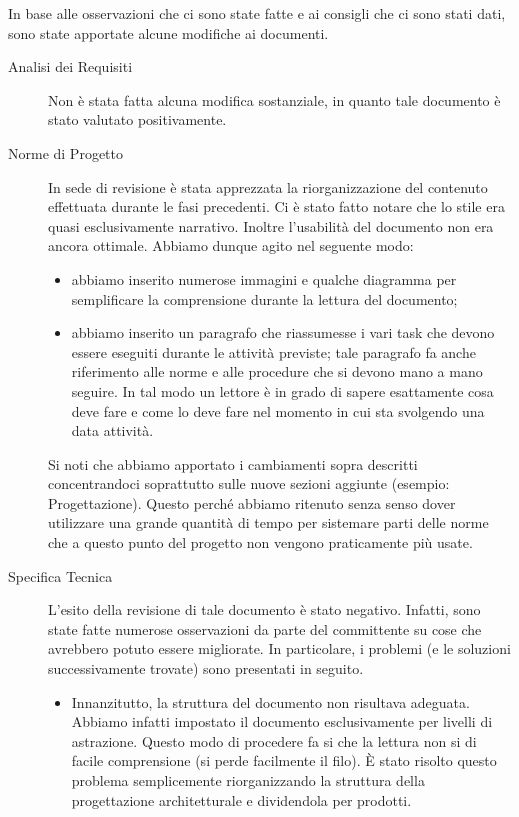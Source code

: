 		In base alle osservazioni che ci sono state fatte e ai consigli che ci sono stati dati, sono state apportate alcune modifiche ai documenti.
		\begin{description}
			\item[Analisi dei Requisiti] Non è stata fatta alcuna modifica sostanziale, in quanto tale documento è stato valutato positivamente.
			\item[Norme di Progetto] In sede di revisione è stata apprezzata la riorganizzazione del contenuto effettuata durante le fasi precedenti. Ci è stato fatto notare che lo stile era quasi esclusivamente narrativo. Inoltre l'usabilità del documento non era ancora ottimale. Abbiamo dunque agito nel seguente modo:
			\begin{itemize}
				\item abbiamo inserito numerose immagini e qualche diagramma per semplificare la comprensione durante la lettura del documento;
				\item abbiamo inserito un paragrafo che riassumesse i vari task che devono essere eseguiti durante le attività previste; tale paragrafo fa anche riferimento alle norme e alle procedure che si devono mano a mano seguire. In tal modo un lettore è in grado di sapere esattamente cosa deve fare e come lo deve fare nel momento in cui sta svolgendo una data attività.
			\end{itemize}
			Si noti che abbiamo apportato i cambiamenti sopra descritti concentrandoci soprattutto sulle nuove sezioni aggiunte (esempio: Progettazione). Questo perché abbiamo ritenuto senza senso dover utilizzare una grande quantità di tempo per sistemare parti delle norme che a questo punto del progetto non vengono praticamente più usate.
			\item[Specifica Tecnica] L'esito della revisione di tale documento è stato negativo. Infatti, sono state fatte numerose osservazioni da parte del committente su cose che avrebbero potuto essere migliorate. In particolare, i problemi (e le soluzioni successivamente trovate) sono presentati in seguito.
			\begin{itemize}
				\item Innanzitutto, la struttura del documento non risultava adeguata. Abbiamo infatti impostato il documento esclusivamente per livelli di astrazione. Questo modo di procedere fa si che la lettura non si di facile comprensione (si perde facilmente il filo). È stato risolto questo problema semplicemente riorganizzando la struttura della progettazione architetturale e dividendola per prodotti.

\end{itemize}
\end{description}
